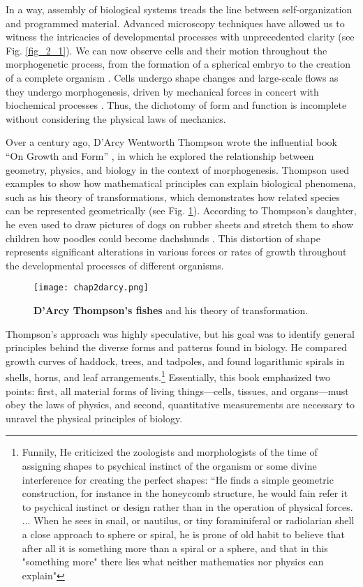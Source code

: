 In a way, assembly of biological systems treads the line between self-organization and programmed material. Advanced microscopy techniques have allowed us to witness the intricacies of developmental processes with unprecedented clarity (see Fig. \ref{fig_2_1}). We can now observe cells and their motion throughout the morphogenetic process, from the formation of a spherical embryo to the creation of a complete organism \cite{shah2019}. Cells undergo shape changes and large-scale flows as they undergo morphogenesis, driven by mechanical forces in concert with biochemical processes \cite{labernadie2018, trepat2018, lecuit2011}. Thus, the dichotomy of form and function is incomplete without considering the physical laws of mechanics.

Over a century ago, D'Arcy Wentworth Thompson wrote the influential book ``On Growth and Form'' \cite{thompson1979}, in which he explored the relationship between geometry, physics, and biology in the context of morphogenesis. Thompson used examples to show how mathematical principles can explain biological phenomena, such as his theory of transformations, which demonstrates how related species can be represented geometrically (see Fig. \ref{fig_2_1b}). According to Thompson's daughter, he even used to draw pictures of dogs on rubber sheets and stretch them to show children how poodles could become dachshunds \cite{wolfram2022}. This distortion of shape represents significant alterations in various forces or rates of growth throughout the developmental processes of different organisms.

\begin{figure}[h!]
	\centering
	\texttt{[image: chap2darcy.png]}
	\caption{\label{fig_2_1b} \textbf{D'Arcy Thompson's fishes} and his theory of transformation. \cite{wolfram2017, thompson1979}}
\end{figure}

Thompson's approach was highly speculative, but his goal was to identify general principles behind the diverse forms and patterns found in biology. He compared growth curves of haddock, trees, and tadpoles, and found logarithmic spirals in shells, horns, and leaf arrangements.\footnote{Funnily, He criticized the zoologists and morphologists of the time of assigning shapes to psychical instinct of the organism or some divine interference for creating the perfect shapes: “He finds a simple geometric construction, for instance in the honeycomb structure, he would fain refer it to psychical instinct or design rather than in the operation of physical forces. ... When he sees in snail, or nautilus, or tiny foraminiferal or radiolarian shell a close approach to sphere or spiral, he is prone of old habit to believe that after all it is something more than a spiral or a sphere, and that in this "something more" there lies what neither mathematics nor physics can explain"}
Essentially, this book emphasized two points: first, all material forms of living things---cells, tissues, and organs---must obey the laws of physics, and second, quantitative measurements are necessary to unravel the physical principles of biology.

